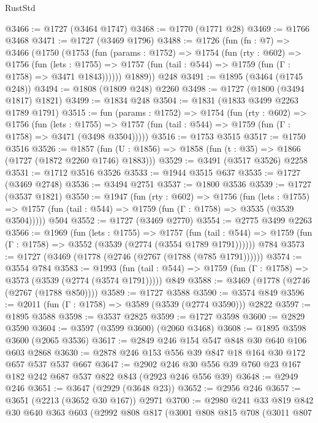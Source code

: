 \begin{lexlean}{RustStd}
\begin{coremodule}
@3466 := @1727 (@3464 @1747)
@3468 := @1770 (@1771 @28)
@3469 := @1766 @3468
@3471 := @1727 (@3469 @1796)
@3488 := @1726
    (fun (fn : @7) =>
    @3466
      (@1750
        (@1753
          (fun (params : @1752) =>
          @1754
            (fun (rty : @602) =>
            @1756
              (fun (lets : @1755) =>
              @1757 (fun (tail : @544) => @1759 (fun (Γ : @1758) => @3471 @1843))))))
        @1889))
    @248
@3491 := @1895 (@3464 (@1745 @248))
@3494 := @1808 (@1809 @248) @2260
@3498 := @1727 (@1800 (@3494 @1817) @1821)
@3499 := @1834 @248
@3504 := @1831 (@1833 @3499 @2263 @1789 @1791)
@3515 := fun (params : @1752) =>
  @1754
    (fun (rty : @602) =>
    @1756
      (fun (lets : @1755) =>
      @1757 (fun (tail : @544) => @1759 (fun (Γ : @1758) => @3471 (@3498 @3504)))))
@3516 := @1753 @3515
@3517 := @1750 @3516
@3526 := @1857 (fun (U : @1856) => @1858 (fun (t : @35) => @1866 (@1727 (@1872 @2260 @1746) @1883)))
@3529 := @3491 (@3517 @3526) @2258
@3531 := @1712 @3516 @3526
@3533 := @1944 @3515 @637
@3535 := @1727 (@3469 @2748)
@3536 := @3494 @2751
@3537 := @1800 @3536
@3539 := @1727 (@3537 @1821)
@3550 := @1947
    (fun (rty : @602) =>
    @1756
      (fun (lets : @1755) =>
      @1757 (fun (tail : @544) => @1759 (fun (Γ : @1758) => @3535 (@3539 @3504)))))
    @504
@3552 := @1727 (@3469 @2770)
@3554 := @2775 @3499 @2263
@3566 := @1969
    (fun (lets : @1755) =>
    @1757
      (fun (tail : @544) => @1759 (fun (Γ : @1758) => @3552 (@3539 (@2774 (@3554 @1789 @1791))))))
    @784
@3573 := @1727 (@3469 (@1778 (@2746 (@2767 (@1788 (@785 @1791))))))
@3574 := @3554 @784
@3583 := @1993
    (fun (tail : @544) => @1759 (fun (Γ : @1758) => @3573 (@3539 (@2774 (@3574 @1791)))))
    @849
@3588 := @3469 (@1778 (@2746 (@2767 (@1788 @850))))
@3589 := @1727 @3588
@3590 := @3574 @849
@3596 := @2011 (fun (Γ : @1758) => @3589 (@3539 (@2774 @3590))) @2822
@3597 := @1895 @3588
@3598 := @3537 @2825
@3599 := @1727 @3598
@3600 := @2829 @3590
@3604 := @3597 (@3599 @3600) (@2060 @3468)
@3608 := @1895 @3598 @3600 (@2065 @3536)
@3617 := @2849 @246 @154 @547 @848 @30 @640 @106 @603 @2868
@3630 := @2878 @246 @153 @556 @39 @847 @18 @164 @30 @172 @657 @537 @537 @667
@3647 := @2902 @246 @30 @556 @39 @760 @23 @167 @182 @242 @687 @537 @822 @843 (@2923 @246 @556 @39)
@3648 := @2949 @246
@3651 := @3647 (@2929 (@3648 @23))
@3652 := @2956 @246
@3657 := @3651 (@2213 (@3652 @30 @167)) @2971
@3700 := @2980
    @241
    @33
    @819
    @842
    @30
    @640
    @363
    @603
    (@2992
      @808
      @817
      (@3001
        @808
        @815
        @708
        (@3011
          @807

\end{coremodule}
\end{lexlean}
